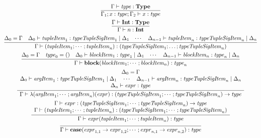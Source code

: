 \begin{gather*}
  \infer{\Gamma_1; x: \mathit{type}; \Gamma_2 \vdash x: \mathit{type}}{
    \Gamma \vdash \mathit{type}: \mathbf{Type}
  }
  \\
  \infer{\Gamma \vdash n: \mathbf{Int}}{
    \Gamma \vdash \mathbf{Int}: \mathbf{Type}
  }
  \\
  \infer{\Gamma \vdash (\mathit{tupleItem}_1; \cdots; \mathit{tupleItem}_n): (\mathit{typeTupleSigItem}_1; \ldots; \mathit{typeTupleSigItem}_n)}{
    \Delta_0 = \Gamma
    &
    \Delta_0 \vdash \mathit{tupleItem}_1: \mathit{typeTupleSigItem}_1 \mid \Delta_1
    &
    \cdots
    &
    \Delta_{n - 1} \vdash \mathit{tupleItem}_n: \mathit{typeTupleSigItem}_n \mid \Delta_n
  }
  \\
  \infer{\Gamma \vdash \mathbf{block}(\mathit{blockItem}_1; \cdots; \mathit{blockItem}_n): \mathit{type}_n}{
    \Delta_0 = \Gamma
    &
    \mathit{type}_0 = ()
    &
    \Delta_0 \vdash \mathit{blockItem}_1: \mathit{type}_1 \mid \Delta_1
    &
    \cdots
    &
    \Delta_{n - 1} \vdash \mathit{blockItem}_n: \mathit{type}_n \mid \Delta_n
  }
  \\
  \infer{\Gamma \vdash \lambda(\mathit{argItem}_1; \cdots; \mathit{argItem}_n)(\mathit{expr}): (\mathit{typeTupleSigItem}_1; \cdots; \mathit{typeTupleSigItem}_n) \rightarrow \mathit{type}}{
    \begin{array}{c}
      \Delta_0 = \Gamma
      \\
      \Delta_0 \vdash \mathit{argItem}_1: \mathit{typeTupleSigItem}_1 \mid \Delta_1
      \hspace{1em}
      \cdots
      \hspace{1em}
      \Delta_{n - 1} \vdash \mathit{argItem}_n: \mathit{typeTupleSigItem}_n \mid \Delta_n
      \\
      \Delta_n \vdash \mathit{expr}: \mathit{type}
    \end{array}
  }
  \\
  \infer{\Gamma \vdash \mathit{expr}(\mathit{tupleItem}_1; \cdots; \mathit{tupleItem}_n): \mathit{type}}{
    \begin{array}{c}
      \Gamma \vdash \mathit{expr}: (\mathit{typeTupleSigItem}_1; \cdots; \mathit{typeTupleSigItem}_n) \rightarrow \mathit{type}
      \\
      \Gamma \vdash (\mathit{tupleItem}_1; \cdots; \mathit{tupleItem}_n): (\mathit{typeTupleSigItem}_1; \cdots; \mathit{typeTupleSigItem}_n)
    \end{array}
  }
  \\
  \infer{\Gamma \vdash \mathbf{case}(\mathit{expr}_{1,1} \rightarrow \mathit{expr}_{1,2}; \cdots; \mathit{expr}_{n,1} \rightarrow \mathit{expr}_{n,2}): \mathit{type}}{
}
\end{gather*}
